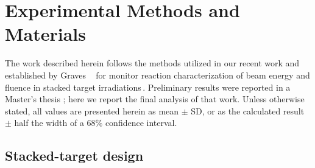 \section{\label{sec:experimental_fe}Experimental Methods and Materials}


The work described herein follows the  methods utilized in our recent work and established by Graves \etal\ 
for monitor reaction characterization of beam energy and fluence in stacked target irradiations\,\cite{Voyles2018a,Graves2016}.
% 
% 
% 
Preliminary results  were reported in a Master's thesis \cite{springer2017investigation}; here we report the final analysis of that work.
Unless otherwise stated, all values are presented herein as mean $\pm$ SD, or as the calculated result $\pm$ half the width of a 68\% confidence interval.



\subsection{\label{sec:target_design_fe}Stacked-target design}


